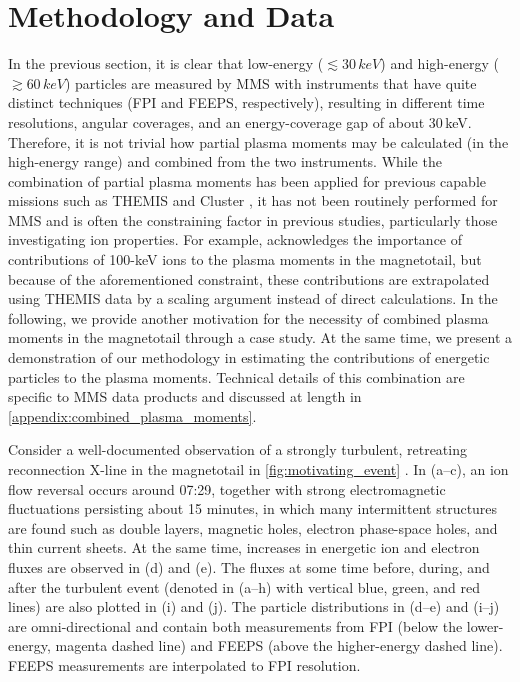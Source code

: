 \documentclass[draft]{agujournal2019}
\begin{document}
\section{Methodology and Data}\label{sec:method}

In the previous section, it is clear that low-energy ($\lesssim30\,\si{keV}$) and high-energy ($\gtrsim60\,\si{keV}$) particles are measured by MMS with instruments that have quite distinct techniques (FPI and FEEPS, respectively), resulting in different time resolutions, angular coverages, and an energy-coverage gap of about 30\,\si{keV}. Therefore, it is not trivial how partial plasma moments may be calculated (in the high-energy range) and combined from the two instruments. While the combination of partial plasma moments has been applied for previous capable missions such as THEMIS \cite{Angelopoulos2008,Hietala2015,Shustov2019} and Cluster \cite{Haaland2010}, it has not been routinely performed for MMS and is often the constraining factor in previous studies, particularly those investigating ion properties. For example,  acknowledges the importance of contributions of 100-\si{keV} ions to the plasma moments in the magnetotail, but because of the aforementioned constraint, these contributions are extrapolated using THEMIS data by a scaling argument instead of direct calculations. In the following, we provide another motivation for the necessity of combined plasma moments in the magnetotail through a case study. At the same time, we present a demonstration of our methodology in estimating the contributions of energetic particles to the plasma moments. Technical details of this combination are specific to MMS data products and discussed at length in \ref{appendix:combined_plasma_moments}. 

Consider a well-documented observation of a strongly turbulent, retreating reconnection X-line in the magnetotail in \cref{fig:motivating_event} \cite{Ergun2018,Ergun2020a,Ergun2020b}. In (a--c), an ion flow reversal occurs around 07:29, together with strong electromagnetic fluctuations persisting about 15 minutes, in which many intermittent structures are found such as double layers, magnetic holes, electron phase-space holes, and thin current sheets. At the same time, increases in energetic ion and electron  fluxes are observed in (d) and (e). The  fluxes at some time before, during, and after the turbulent event (denoted in (a--h) with vertical blue, green, and red lines) are also plotted in (i) and (j). The particle distributions in (d--e) and (i--j) are omni-directional and contain both measurements from FPI (below the lower-energy, magenta dashed line) and FEEPS (above the higher-energy dashed line). FEEPS measurements are interpolated to FPI resolution.
\end{document}
